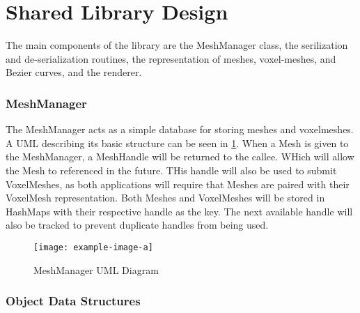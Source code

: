 \section{Shared Library Design} \label{SharedLibrary}


The main components of the library are the MeshManager class, the serilization and 
de-serialization routines, the representation of meshes, voxel-meshes, and Bezier curves, and the
renderer.


\subsubsection{MeshManager}
The MeshManager acts as a simple database for storing meshes and voxelmeshes. A UML describing its
basic structure can be seen in \ref{fig:MeshManagerUML}. When a Mesh is given to the MeshManager, a
MeshHandle will be returned to the callee. WHich will allow the Mesh to referenced in the future.
THis handle will also be used to submit VoxelMeshes, as both applications will require that Meshes 
are paired with their VoxelMesh representation. Both Meshes and VoxelMeshes will be stored in 
HashMaps with their respective handle as the key. The next available handle will also be tracked
to prevent duplicate handles from being used.

\begin{figure}[h]
  \centering
  \texttt{[image: example-image-a]}
  \caption{MeshManager UML Diagram}
  \label{fig:MeshManagerUML}
\end{figure}

\subsubsection{Object Data Structures}

